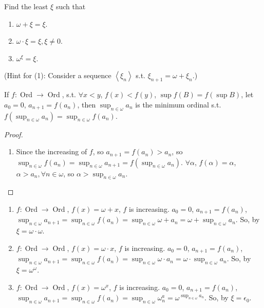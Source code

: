 \documentclass{ctexart}
\DeclareMathOperator{\ord}{Ord}
\begin{document}
\begin{problem}
Find the least $\xi$ such that
\begin{enumerate}[label=\alph*,ref=\theproblem.\alph*]
\item  $\omega+\xi=\xi$.
\item  $\omega \cdot \xi=\xi, \xi \neq 0$.
\item  $\omega^{\xi}=\xi$.
\end{enumerate}
(Hint for (1): Consider a sequence $\left\langle\xi_n\right\rangle$ s.t. $\xi_{n+1}=\omega+\xi_n$.)
\end{problem}
\begin{solution}
    \begin{lemma}\label{lem:2}
        If $f:\ord\to\ord$, s.t. $\forall x< y$, $f(x)< f(y)$, $\sup f(B)=f(\sup B)$, let $a_0=0$, $a_{n+1}=f(a_n)$, then $\sup_{n\in \omega} a_n$ is the minimum ordinal s.t. $f(\sup_{n\in \omega} a_n)=\sup_{n\in \omega} f(a_n)$.
    \end{lemma}
    \begin{proof}
        \begin{enumerate}
            \item Since the increasing of $f$, so $a_{n+1}=f(a_n)>a_n$, so $\sup_{n\in \omega} f(a_n)=\sup_{n\in \omega} a_{n+1}=f(\sup_{n\in \omega} a_n)$. $\forall \alpha$, $f(\alpha)=\alpha$, $\alpha>a_n, \forall n\in \omega$, so $\alpha>\sup_{n\in \omega}a_n$.
        \end{enumerate}
    \end{proof}
    \begin{enumerate}
        \item $f:\ord \to\ord$, $f(x)=\omega+x$, $f$ is increasing. $a_0=0$, $a_{n+1}=f(a_{n})$, $\sup_{n\in \omega}a_{n+1}=\sup_{n\in \omega}f(a_n)=\sup_{n\in \omega}\omega+a_n=\omega+\sup_{n\in \omega}a_n$. So, by  $\xi=\omega\cdot\omega$.
        \item $f:\ord \to\ord$, $f(x)=\omega\cdot x$, $f$ is increasing. $a_0=0$, $a_{n+1}=f(a_{n})$, $\sup_{n\in \omega}a_{n+1}=\sup_{n\in \omega}f(a_n)=\sup_{n\in \omega}\omega\cdot a_n=\omega\cdot\sup_{n\in \omega}a_n$. So, by  $\xi=\omega^\omega$.
        \item $f:\ord \to\ord$, $f(x)=\omega^x$, $f$ is increasing. $a_0=0$, $a_{n+1}=f(a_{n})$, $\sup_{n\in \omega}a_{n+1}=\sup_{n\in \omega}f(a_n)=\sup_{n\in \omega}\omega^a_n=\omega^{\sup_{n\in \omega}a_n}$. So, by  $\xi=\epsilon_0$.
    \end{enumerate}
    
    
\end{solution}
\end{document}
